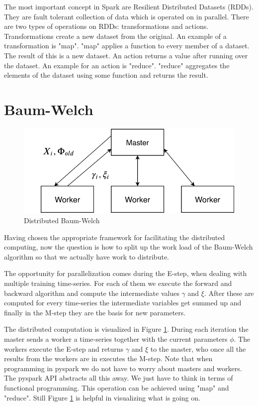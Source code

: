The most important concept in Spark are Resilient Distributed Datasets (RDDs). They are fault tolerant collection of data which is operated on in parallel. There are two types of operations on RDDs: transformations and actions. Transformations create a new dataset from the original. An example of a transformation is "map". "map" applies a function to every member of a dataset. The result of this is a new dataset. An action returns a value after running over the dataset. An example for an action is "reduce". "reduce" aggregates the elements of the dataset using some function and returns the result. \parencite{rddguide}

\section{Baum-Welch}
\label{section:distributed-hmm}

\begin{figure}
  \centering
  \includegraphics{figures/distributed.pdf}
  \caption{Distributed Baum-Welch}
  \label{fig:distributed}
\end{figure}

Having chosen the appropriate framework for facilitating the distributed computing, now the question is how to split up the work load of the Baum-Welch algorithm so that we actually have work to distribute. 

The opportunity for parallelization comes during the E-step, when dealing with multiple training time-series. For each of them we execute the forward and backward algorithm and compute the intermediate values $\gamma$ and $\xi$. After these are computed for every time-series the intermediate variables get summed up and finally in the M-step they are the basis for new parameters. 

The distributed computation is visualized in Figure \ref{fig:distributed}. During each iteration the master sends a worker a time-series together with the current parameters $\phi$. The workers execute the E-step and returns $\gamma$ and $\xi$ to the master, who once all the results from the workers are in executes the M-step. Note that when programming in pyspark we do not have to worry about masters and workers. The pyspark API abstracts all this away. We just have to think in terms of functional programming. This operation can be achieved using "map" and "reduce". Still Figure \ref{fig:distributed} is helpful in visualizing what is going on. 

